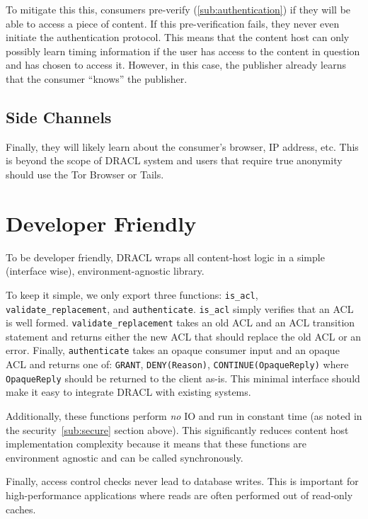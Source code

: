 \documentclass[pdftex,12pt,a4papaer]{report}
\begin{document}
To mitigate this this, consumers pre-verify (\ref{sub:authentication}) if they
will be able to access a piece of content. If this pre-verification fails, they
never even initiate the authentication protocol. This means that the content
host can only possibly learn timing information if the user has access to the
content in question and has chosen to access it. However, in this case, the
publisher already learns that the consumer ``knows'' the publisher.

\subsection{Side Channels}

Finally, they will likely learn about the consumer's browser, IP address, etc.
This is beyond the scope of DRACL system and users that require true anonymity
should use the Tor Browser\cite{tor} or Tails\cite{tails}.

\section{Developer Friendly}

To be developer friendly, DRACL wraps all content-host logic in a simple
(interface wise), environment-agnostic library.

To keep it simple, we only export three functions: \verb=is_acl=,
\verb=validate_replacement=, and \verb=authenticate=. \verb=is_acl= simply
verifies that an ACL is well formed. \verb=validate_replacement= takes an old
ACL and an ACL transition statement and returns either the new ACL that should
replace the old ACL or an error. Finally, \verb=authenticate= takes an opaque
consumer input and an opaque ACL and returns one of: \verb=GRANT=,
\verb=DENY(Reason)=, \verb=CONTINUE(OpaqueReply)= where \verb=OpaqueReply=
should be returned to the client as-is. This minimal interface should make it
easy to integrate DRACL with existing systems.

Additionally, these functions perform \emph{no} IO and run in constant time (as
noted in the security~\ref{sub:secure} section above). This significantly
reduces content host implementation complexity because it means that these
functions are environment agnostic and can be called synchronously.

Finally, access control checks never lead to database writes. This is important
for high-performance applications where reads are often performed out of
read-only caches.
\end{document}
